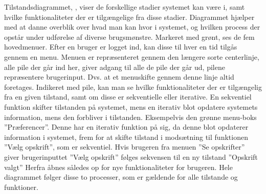 Tilstandsdiagrammet, , viser de forskellige stadier systemet kan være i, samt hvilke funktionaliteter der er tilgængelige fra disse stadier.
Diagrammet hjælper med at danne overblik over hvad man kan hvor i systemet, og hvilken process der opstår under udførelse af diverse brugsmønstre.
Markeret med grønt, ses de fem hovedmenuer.
Efter en bruger er logget ind, kan disse til hver en tid tilgås gennem en menu.
Menuen er repræsenteret gennem den længere sorte centerlinje,  alle pile der går ind her, giver adgang til alle de pile der går ud, pilene repræsentere brugerinput.
Dvs. at et menuskifte gennem denne linje altid foretages.
Indikeret med pile, kan man se hvilke funktionaliteter der er tilgængelig fra en given tilstand, samt om disse er sekventielle eller iterative.
En sekventiel funktion skifter tilstanden på systemet, mens en iterativ blot opdatere systemets information, mens den forbliver i tilstanden.
Eksempelvis den grønne menu-boks ''Præferencer''.
Denne har en iterativ funktion på sig, da denne blot opdaterer information i systemet, frem for at skifte tilstand i modsætning til funktionen ''Vælg opskrift'', som er sekventiel.
Hvis brugeren fra menuen ''Se opskrifter'' giver brugerinputtet ''Vælg opskrift'' følges sekvensen til en ny tilstand ''Opskrift valgt'' Herfra åbnes således op for nye funktionaliteter for brugeren.
Hele diagrammet følger disse to processer, som er gældende for alle tilstande og funktioner.

